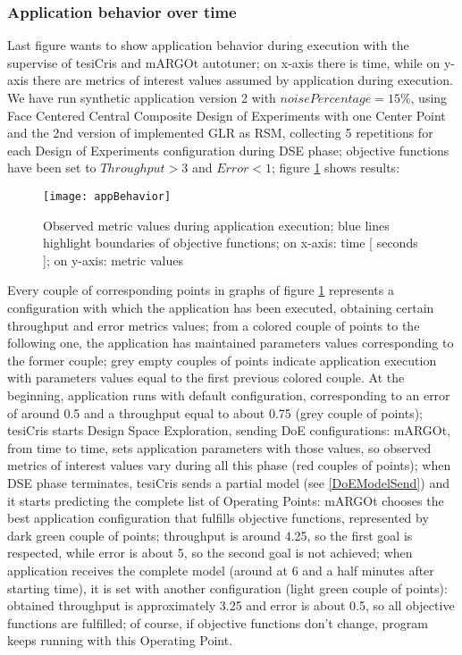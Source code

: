 \subsubsection{Application behavior over time}

Last figure wants to show application behavior during execution with the supervise of tesiCris and mARGOt autotuner; on x-axis there is time, while on y-axis there are metrics of interest values assumed by application during execution. We have run synthetic application version 2 with $noisePercentage = 15\%$, using Face Centered Central Composite Design of Experiments with one Center Point and the 2nd version of implemented GLR as RSM, collecting 5 repetitions for each Design of Experiments configuration during DSE phase; objective functions have been set to $Throughput > 3$ and $Error < 1$; figure \ref{fig::appBeh} shows results:

\begin{figure}[H]

    \centering
    \texttt{[image: appBehavior]}
    \caption{Observed metric values during application execution; blue lines highlight boundaries of objective functions; on x-axis: time [ seconds ]; on y-axis: metric values}
    \label{fig::appBeh}
    
\end{figure}

Every couple of corresponding points in graphs of figure \ref{fig::appBeh} represents a configuration with which the application has been executed, obtaining certain throughput and error metrics values; from a colored couple of points to the following one, the application has maintained parameters values corresponding to the former couple; grey empty couples of points indicate application execution with parameters values equal to the first previous colored couple. At the beginning, application runs with default configuration, corresponding to an error of around 0.5 and a throughput equal to about 0.75 (grey couple of points); tesiCris starts Design Space Exploration, sending DoE configurations: mARGOt, from time to time, sets application parameters with those values, so observed metrics of interest values vary during all this phase (red couples of points); when DSE phase terminates, tesiCris sends a partial model (see \ref{DoEModelSend}) and it starts predicting the complete list of Operating Points: mARGOt chooses the best application configuration that fulfills objective functions, represented by dark green couple of points; throughput is around 4.25, so the first goal is respected, while error is about 5, so the second goal is not achieved; when application receives the complete model (around at 6 and a half minutes after starting time), it is set with another configuration (light green couple of points): obtained throughput is approximately 3.25 and error is about 0.5, so all objective functions are fulfilled; of course, if objective functions don't change, program keeps running with this Operating Point.




